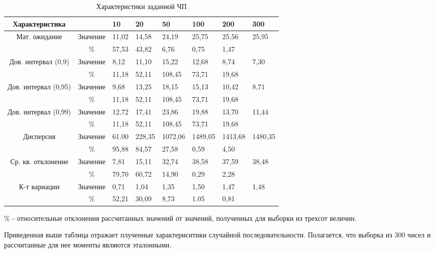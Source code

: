 \documentclass[14pt]{article}
\begin{document}
\begin{table}[h]
	\centering
	\caption{Характеристики заданной ЧП}
	\begin{tabularx}{\textwidth}{| c | c | X | X | X | X | X | X |}
		\hline
		Характеристика & & 10 & 20 & 50 & 100 & 200 & 300 \\
		\hline
		\multirow{2}{*}{Мат. ожидание} & Значение & 11,02  & 14,58  & 24,19  &  25,75 & 25,56 & \multirow{2}{*}{25,95} \\
		\cline{2-7}
		 & \% &  57,53 & 43,82 & 6,76 & 0,75  & 1,47  &   \\
		\hline
		\multirow{2}{*}{Дов. интервал (0,9)} & Значение & 8,12  & 11,10  & 15,22  &  12,68 & 8,74 & \multirow{2}{*}{7,30} \\
		\cline{2-7}
		 & \% & 11,18 & 52,11 & 108,45 & 73,71  & 19,68  & \\
		\hline
		\multirow{2}{*}{Дов. интервал (0,95)} & Значение  & 9,68  & 13,25 & 18,15 & 15,13 & 10,42 &  \multirow{2}{*}{8,71} \\
		\cline{2-7}
		 & \% & 11,18 & 52,11 & 108,45 & 73,71  & 19,68 &  \\
		\hline
		\multirow{2}{*}{Дов. интервал (0,99)} & Значение & 12,72 & 17,41 & 23,86 & 19,88 & 13,70 & \multirow{2}{*}{11,44} \\
		\cline{2-7}
		& \% & 11,18 & 52,11 & 108,45 & 73,71  & 19,68  & \\
		\hline
		\multirow{2}{*}{Дисперсия} & Значение & 61.00 & 228,35 & 1072,06 & 1489,05  & 1413,68 & \multirow{2}{*}{1480,35} \\
		\cline{2-7}
		 & \% &  95,88 & 84,57 & 27,58 & 0,59 & 4,50 & \\
		\hline
		\multirow{2}{*}{Ср. кв. отклонение} & Значение & 7,81 & 15,11 & 32,74  & 38,58 & 37,59 & \multirow{2}{*}{38,48} \\
		\cline{2-7}
		 & \% & 79,70 & 60,72 & 14,90 & 0,29 & 2,28 & \\
		\hline
		\multirow{2}{*}{К-т вариации} & Значение & 0,71 & 1,04 & 1,35 & 1,50 & 1,47 & \multirow{2}{*}{1,48} \\
		\cline{2-7}
		 & \% & 52,21 & 30,09 & 8,73 & 1.05 & 0,81 &  \\
		\hline
	\end{tabularx}
\end{table}
	\% - относительные отклонения рассчитанных значений от значений, полученных для выборки из трехсот величин.

	Приведенная выше таблица отражает плученные характериситики случайной последовательности. Полагается, что выборка из 300 чисел и рассчитанные для нее моменты являются эталонными.
\end{document}
